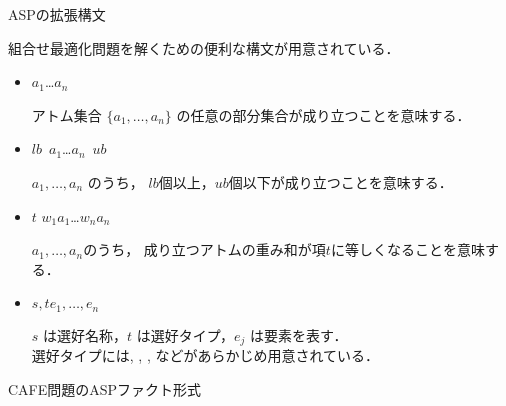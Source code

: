 \documentclass[dvipdfmx, 11pt]{beamer}
\begin{document}
\begin{frame}{ASPの拡張構文}
  \begin{alertblock}{}\centering
    組合せ最適化問題を解くための便利な構文が用意されている．
  \end{alertblock}

  \begin{itemize}
 \item {}
   \begin{center}
     \code{\{}$a_1$\code{;}\ldots\code{;}$a_n$\code{\}}
   \end{center}
   アトム集合 $\{a_1,\dots,a_n\}$
   の任意の部分集合が成り立つことを意味する．
 \item {}
   \begin{center}
     $lb$\ \code{\{}$a_1$\code{;}\ldots\code{;}$a_n$\code{\}}\ $ub$
   \end{center}
   $a_1,\dots,a_n$ のうち，
   $lb$個以上，$ub$個以下が成り立つことを意味する．
 \item {}
   \begin{center}
     $t$  \code{\{} $w_1$\code{:}$a_1$\code{;}\ldots\code{;}$w_n$\code{:}$a_n$ \code{\}}
   \end{center}
   $a_1,\dots,a_n$のうち，
   成り立つアトムの重み和が項$t$に等しくなることを意味する．
 \item {}
       \begin{center}
	$s,t$\code{)\{}$e_1,\dots,e_n$
       \end{center}
       $s$ は選好名称，$t$ は選好タイプ，$e_j$ は要素を表す．\\
       選好タイプには, , , 
       などがあらかじめ用意されている．
 \end{itemize}
\end{frame}
\begin{frame}{CAFE問題のASPファクト形式}
  \begin{multicols}{2}
    \scriptsize
    
  \end{multicols}
\end{frame}
\end{document}
